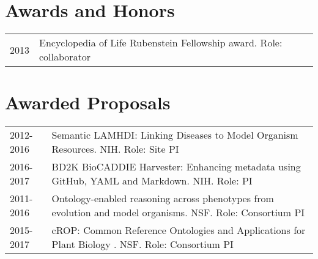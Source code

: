 \documentclass[11pt,fullpage]{article}
\begin{document}




\section*{Awards and Honors}

\begin{longtable}{p{0.5in}|p{5.5in}}

 2013 & Encyclopedia of Life Rubenstein Fellowship award. Role: collaborator \\

\end{longtable}


\section*{Awarded Proposals}

\begin{longtable}{p{0.5in}|p{5.5in}}

2012-2016 & Semantic LAMHDI: Linking Diseases to Model Organism Resources. NIH. Role: Site PI \\
2016-2017 & BD2K BioCADDIE Harvester: Enhancing metadata using GitHub, YAML and Markdown. NIH. Role: PI \\
2011-2016 & Ontology-enabled reasoning across phenotypes from evolution and model organisms. NSF. Role: Consortium PI \\
2015-2017 & cROP: Common Reference Ontologies and Applications for Plant Biology . NSF. Role: Consortium PI \\

\end{longtable}
\end{document}
